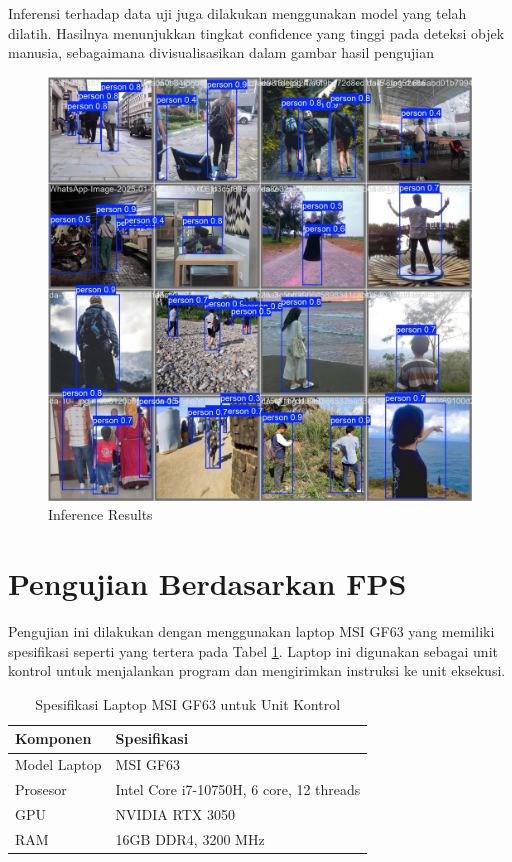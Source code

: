 Inferensi terhadap data uji juga dilakukan menggunakan model yang telah dilatih. Hasilnya menunjukkan tingkat confidence yang tinggi pada deteksi objek manusia, sebagaimana divisualisasikan dalam gambar hasil pengujian

\begin{figure}[H]
    \centering
    \includegraphics[scale=0.2]{gambar/pred.jpg}
    \caption{Inference Results}
    \label{fig:Inference Results}
\end{figure}

\section{Pengujian Berdasarkan FPS}
\label{sec:pengujianberdasarkanfps}
Pengujian ini dilakukan dengan menggunakan laptop MSI GF63 yang memiliki spesifikasi seperti yang tertera pada Tabel \ref{tab:spesifikasilaptop}. Laptop ini digunakan sebagai unit kontrol untuk menjalankan program dan mengirimkan instruksi ke unit eksekusi.

\begin{table}[H]
    \centering
    \caption{Spesifikasi Laptop MSI GF63 untuk Unit Kontrol}
    \label{tab:spesifikasilaptop}
    \begin{tabular}{|l|l|}
        \hline
        \rowcolor[HTML]{C0C0C0}
        \textbf{Komponen} & \textbf{Spesifikasi}  \\
        \hline
        Model Laptop            & MSI GF63                                 \\ \hline
        Prosesor                & Intel Core i7-10750H, 6 core, 12 threads \\ \hline
        GPU                     & NVIDIA RTX 3050                          \\ \hline
        RAM                     & 16GB DDR4, 3200 MHz                      \\ \hline
    \end{tabular}
\end{table}

